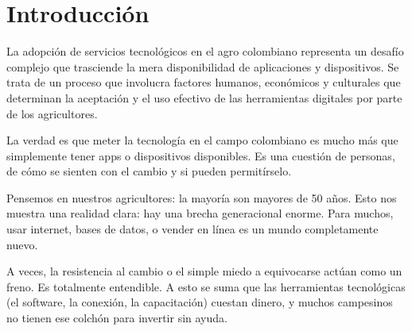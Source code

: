 \begin{abstract}
La adopción de servicios tecnológicos en el agro colombiano va más allá de la mera disponibilidad de aplicaciones y dispositivos; implica comprender las actitudes de los agricultores hacia el cambio y su capacidad económica. Este artículo analiza las barreras generacionales, económicas y culturales que enfrentan los productores rurales, mayoritariamente mayores de 50 años, y propone estrategias para una transformación digital inclusiva a través del Portal Agro Comercial del Huila. Se enfatiza en el diseño amigable, la capacitación presencial y la integración de funcionalidades offline para eliminar la brecha digital y promover el comercio justo, la trazabilidad y la sostenibilidad en la agricultura colombiana. La adopción tecnológica requiere un enfoque integral que considere factores humanos, económicos y culturales. El portal se posiciona como herramienta clave para cerrar la brecha digital en zonas rurales, facilitando el acceso a mercados y fortaleciendo la economía local. Las estrategias incluyen capacitación, diseño intuitivo y modos offline para superar barreras de conectividad.
\end{abstract}

\section{Introducción}

La adopción de servicios tecnológicos en el agro colombiano representa un desafío complejo que trasciende la mera disponibilidad de aplicaciones y dispositivos. Se trata de un proceso que involucra factores humanos, económicos y culturales que determinan la aceptación y el uso efectivo de las herramientas digitales por parte de los agricultores.

La verdad es que meter la tecnología en el campo colombiano es mucho más que simplemente tener apps o dispositivos disponibles. Es una cuestión de personas, de cómo se sienten con el cambio y si pueden permitírselo.

Pensemos en nuestros agricultores: la mayoría son mayores de 50 años. Esto nos muestra una realidad clara: hay una brecha generacional enorme. Para muchos, usar internet, bases de datos, o vender en línea es un mundo completamente nuevo.

A veces, la resistencia al cambio o el simple miedo a equivocarse actúan como un freno. Es totalmente entendible. A esto se suma que las herramientas tecnológicas (el software, la conexión, la capacitación) cuestan dinero, y muchos campesinos no tienen ese colchón para invertir sin ayuda.

